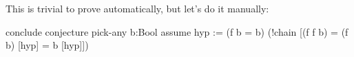 %
%
This is trivial to prove automatically, but let's do it manually:
\begin{tcAthena}
conclude conjecture
  pick-any b:Bool
    assume hyp := (f b = b)
      (!chain [(f f b)
             = (f b)    [hyp]
             = b        [hyp]])
\end{tcAthena}
